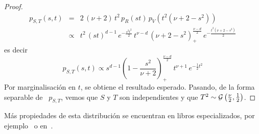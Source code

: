\begin{proof}
  \begin{eqnarray*}
  p_{S,T}(s,t) & = & 2 \, (\nu+2) \, t^2 \, p_R(st) \, p_V\left( t^2 (\nu+2-s^2)
  \right)\\[2mm]
  & \propto & t^2 \, (s t)^{d-1} \, e^{-\frac{s^2 t^2}{2}} \, t^{\nu-d} \,
  \left( \nu+2-s^2 \right)_+^{\frac{\nu-d}{2}} \, e^{-\frac{t^2 (\nu+2-s^2)}{2}}
  \end{eqnarray*}
  es decir
  \[
  p_{S,T}(s,t)     \propto    s^{d-1}     \left(    1     -    \frac{s^2}{\nu+2}
  \right)_+^{\frac{\nu-d}{2}} \, t^{\nu+1} \, e^{-\frac12 t^2}
    \]
    Por marginalisaci\'on en $t$, se  obtiene el resultado esperado. Pasando, de
    la forma separable de \ $p_{S,T}$,  vemos que $S$ y $T$ son independientes y
    que $T^2 \sim \mathcal{G}\left( \frac{\nu}{2} , \frac12 \right)$.
\end{proof}

M\'as propiedades de esta distribuci\'on se encuentran en libros especializados,
por ejemplo~\cite{FanKot90, KotBal00} o en~\cite[Sec.~3.2.1]{Zoz12}.



